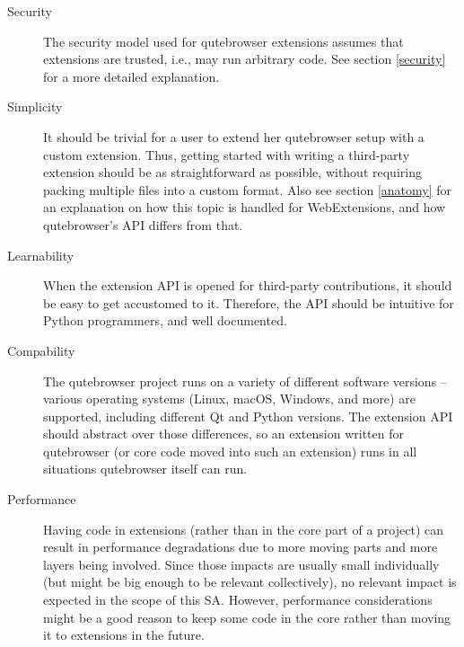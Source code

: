 \documentclass[a4paper,parskip=full]{scrreprt}
\newcommand{\fixme}[1]{\textbf{FIXME} \emph{#1}}
\begin{document}
\begin{description}
  \item[Security] The security model used for qutebrowser extensions assumes
    that extensions are trusted, i.e., may run arbitrary code. See
    section \ref{security} for a more detailed explanation.
  \item[Simplicity] It should be trivial for a user to extend her qutebrowser
    setup with a custom extension. Thus, getting started with writing a
    third-party extension should be as straightforward as possible, without
    requiring packing multiple files into a custom format. Also see section
    \ref{anatomy} for an explanation on how this topic is handled for
    WebExtensions, and how qutebrowser's API differs from that.
  \item[Learnability] When the extension API is opened for third-party
    contributions, it should be easy to get accustomed to it. Therefore, the API
    should be intuitive for Python programmers, and well documented.
  \item[Compability] The qutebrowser project runs on a variety of different
    software versions -- various operating systems (Linux, macOS, Windows,
    and more) are supported, including different Qt and Python versions. The
    extension API should abstract over those differences, so an extension
    written for qutebrowser (or core code moved into such an extension) runs in
    all situations qutebrowser itself can run.
  \item[Performance] Having code in extensions (rather than in the core part of a
    project) can result in performance degradations due to more moving parts and
    more layers being involved. Since those impacts are usually small
    individually (but might be big enough to be relevant collectively), no
    relevant impact is expected in the scope of this SA. However, performance
    considerations might be a good reason to keep some code in the core rather
    than moving it to extensions in the future.
\end{description}

% 
% 
% 
\end{document}
